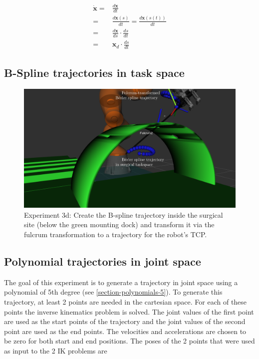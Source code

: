 \begin{equation}
\begin{aligned}
\mathbf{\dot{x}} ={}& \frac{d\mathbf{x}}{dt}  \\
	={}& \frac{d\mathbf{x}(s)}{dt} = \frac{d\mathbf{x}(s(t))}{dt}   \\
    ={}& \frac{d\mathbf{x}}{ds} \cdot \frac{ds}{dt} \\
    ={}& \mathbf{x}_d \cdot \frac{ds}{dt}
\end{aligned}
\end{equation}


\subsection{B-Spline trajectories in task space}

\begin{center}
\begin{figure}[!htb]
\centering
\includegraphics[width=\textwidth]{images/robot_planner3/3d_bezier_spline.png}
\caption{Experiment 3d: Create the B-spline trajectory inside the surgical site (below the green mounting dock) and transform it via the fulcrum transformation to a trajectory for the robot's TCP.}
\label{robot-planner3d-bezier-spline}
\end{figure}
\end{center}


\subsection{Polynomial trajectories in joint space}
\label{section:9-2-polynomial-traj}

The goal of this experiment is to generate a trajectory in joint space using a polynomial of 5th degree (see \ref{section-polynomials-5}). To generate this trajectory, at least 2 points are needed in the cartesian 
space. For each of these points the inverse kinematics problem is solved. The joint values of the first point are used as the start points of the trajectory and the joint values of the second point are used as the end points.
The velocities and accelerations are chosen to be zero for both start and end positions. The poses of the 2 points that were used as input to the 2 IK problems are

